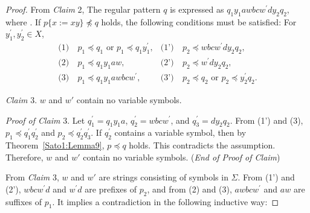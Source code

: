 \begin{proof}
  \smallskip

  From \textit{Claim} 2, The regular pattern $q$ is expressed as $q_{1}y_{1}awbcw^{\prime}dy_{2}q_{2}$, where \TheConditionA.
  If $p \{ x := xy \} \not \preceq q$ holds, the following conditions must be satisfied:
  For $y_{1}^{\prime},y_{2}^{\prime}\in X$,
  \begin{align*}
    \textrm{(1)}~& p_{1} \preceq q_{1} \mbox{ or } p_{1} \preceq q_{1}y_{1}^{\prime}, & \textrm{(1')}~& p_{2} \preceq wbcw^{\prime}dy_{2}q_{2}, \\
    \textrm{(2)}~& p_{1} \preceq q_{1}y_{1}aw, & \textrm{(2')}~& p_{2} \preceq w^{\prime}dy_{2}q_{2}, \\
    \textrm{(3)}~& p_{1} \preceq q_{1}y_{1}awbcw^{\prime}, & \textrm{(3')}~& p_{2} \preceq q_{2} \mbox{ or } p_{2} \preceq y_{2}^{\prime}q_{2}.
  \end{align*}

  \smallskip

  \noindent
  \textit{Claim} 3. $w$ and $w'$ contain no variable symbols.

  \smallskip
  \noindent
  \textit{Proof of Claim} 3.
  Let $q_{1}^{\prime} = q_{1}y_{1}a$, $q_{2}^{\prime} = wbcw^{\prime}$, and $q_{3}^{\prime} = dy_{2}q_{2}$.
  From (1') and (3), $p_{1} \preceq q^{\prime}_{1}q^{\prime}_{2}$ and $p_{2} \preceq q^{\prime}_{2}q^{\prime}_{3}$.
  If $q_{2}^{\prime}$ contains a variable symbol, then by Theorem~\ref{Sato1:Lemma9}, $p \preceq q$ holds.
  This contradicts the assumption.
  Therefore, $w$ and $w'$ contain no variable symbols.
  (\textit{End of Proof of Claim})

  \smallskip

  From \textit{Claim} 3, $w$ and $w'$ are strings consisting of symbols in $\Sigma$.
  From (1') and (2'), $wbcw^{\prime}d$ and $w^{\prime}d$ are prefixes of $p_{2}$, and from (2) and (3), $awbcw^{\prime}$ and $aw$ are suffixes of $p_{1}$.
  It implies a contradiction in the following inductive way:
  

\end{proof}
